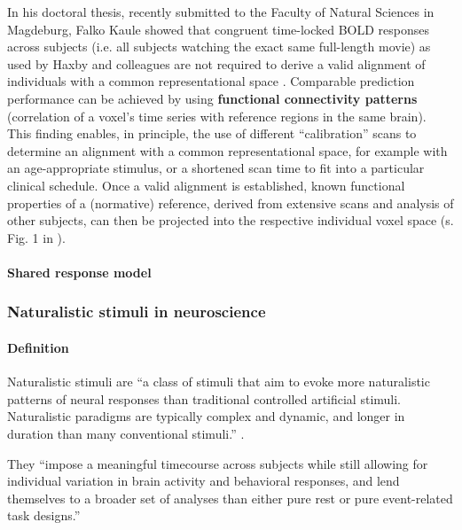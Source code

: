%
In his doctoral thesis, recently submitted to the Faculty of Natural Sciences in
Magdeburg, Falko Kaule showed that congruent time-locked BOLD responses across
subjects (i.e. all subjects watching the exact same full-length movie) as used
by Haxby and colleagues are not required to derive a valid alignment of
individuals with a common representational space \citep{kaule2017examination}.
%
Comparable prediction performance can be achieved by using \textbf{functional
connectivity patterns} (correlation of a voxel's time series with reference
regions in the same brain).
%
This finding enables, in principle, the use of different ``calibration'' scans
to determine an alignment with a common representational space, for example with
an age-appropriate stimulus, or a shortened scan time to fit into a particular
clinical schedule.
%
Once a valid alignment is established, known functional properties of a
(normative) reference, derived from extensive scans and analysis of other
subjects, can then be projected into the respective individual voxel space (s.
Fig. 1 in \citep{nishimoto2016lining}).


\paragraph{Shared response model}

\citep{chen2015reduced}




\subsubsection{Naturalistic stimuli in neuroscience}


\paragraph{Definition}
%
Naturalistic stimuli are ``a class of stimuli that aim to evoke more
naturalistic patterns of neural responses than traditional controlled artificial
stimuli. Naturalistic paradigms are typically complex and dynamic, and longer
in duration than many conventional stimuli.'' \citep{vanderwal2019movies}.

%
They ``impose a meaningful timecourse across subjects while still allowing for
individual variation in brain activity and behavioral responses, and lend
themselves to a broader set of analyses than either pure rest or pure
event-related task designs.'' \citep{finn2017can}

